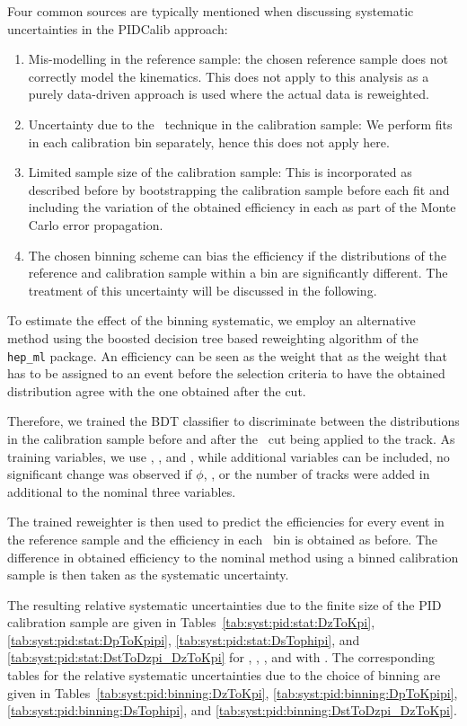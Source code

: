 Four common sources are typically mentioned when discussing systematic 
uncertainties in the PIDCalib approach:
\begin{enumerate}
  \item Mis-modelling in the reference sample: the chosen reference
    sample does not correctly model the kinematics. This does not apply
    to this analysis as a purely data-driven approach is used where the
    actual data is reweighted.
  \item Uncertainty due to the \sPlot\ technique in the calibration sample:
    We perform fits in each calibration bin separately, hence this does not 
    apply here.
  \item Limited sample size of the calibration sample: This is incorporated
    as described before by bootstrapping the calibration sample before each
    fit and including the variation of the obtained efficiency in each as 
    part of the Monte Carlo error propagation.
  \item The chosen binning scheme can bias the efficiency if the distributions 
    of the reference and calibration sample within a bin are significantly
    different. The treatment of this uncertainty will be discussed in the following.
\end{enumerate}

To estimate the effect of the binning systematic, we employ an alternative method using
the boosted decision tree based reweighting algorithm of the \texttt{hep\_ml} package.
An efficiency can be seen as the weight that as the weight that has to be assigned
to an event before the selection criteria to have the obtained distribution agree
with the one obtained after the cut.

Therefore, we trained the BDT classifier to discriminate between the 
distributions in the calibration sample before and after the \dllkpi\ cut being 
applied to the track. As
training variables, we use \ptot, \Eta, and \spd, while additional variables 
can be
included, no significant change was observed if $\phi$, \pT, or the number of 
tracks were
added in additional to the nominal three variables.

The trained reweighter is then used to predict the efficiencies for every event in the
reference sample and the efficiency in each \pTy\ bin is obtained as before.  
The difference
in obtained efficiency to the nominal method using a binned calibration sample is then taken
as the systematic uncertainty.

The resulting relative systematic uncertainties due to the finite size of the 
\ac{PID} calibration sample are given in 
Tables~\ref{tab:syst:pid:stat:DzToKpi},
\ref{tab:syst:pid:stat:DpToKpipi},
\ref{tab:syst:pid:stat:DsTophipi}, and
\ref{tab:syst:pid:stat:DstToDzpi_DzToKpi} for \DzToKpi, \DpToKpipi, 
\DspTophipi, and \DstToDzpi with \DzToKpi.
The corresponding tables for the relative systematic uncertainties due to the 
choice of binning are given in Tables~\ref{tab:syst:pid:binning:DzToKpi},
\ref{tab:syst:pid:binning:DpToKpipi},
\ref{tab:syst:pid:binning:DsTophipi}, and
\ref{tab:syst:pid:binning:DstToDzpi_DzToKpi}.

